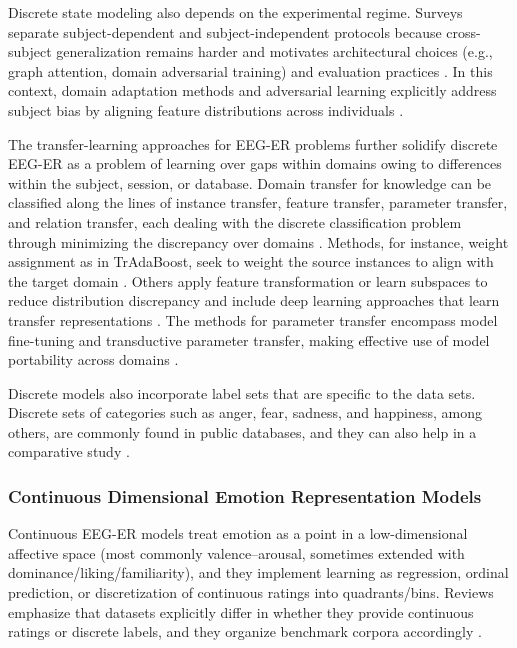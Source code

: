 \documentclass{WileyMSP-template}
\begin{document}
Discrete state modeling also depends on the experimental regime. Surveys separate subject-dependent and subject-independent protocols because cross-subject generalization remains harder and motivates architectural choices (e.g., graph attention, domain adversarial training) and evaluation practices \cite{ma2024peerjreview}. In this context, domain adaptation methods and adversarial learning explicitly address subject bias by aligning feature distributions across individuals \cite{geng2025dlreview}. 

The transfer-learning approaches for EEG-ER problems further solidify discrete EEG-ER as a problem of learning over gaps within domains owing to differences within the subject, session, or database. Domain transfer for knowledge can be classified along the lines of instance transfer, feature transfer, parameter transfer, and relation transfer, each dealing with the discrete classification problem through minimizing the discrepancy over domains \cite{li2022transferreview}. Methods, for instance, weight assignment as in TrAdaBoost, seek to weight the source instances to align with the target domain \cite{li2022transferreview}. Others apply feature transformation or learn subspaces to reduce distribution discrepancy and include deep learning approaches that learn transfer representations \cite{li2022transferreview}. The methods for parameter transfer encompass model fine-tuning and transductive parameter transfer, making effective use of model portability across domains \cite{li2022transferreview}. 

Discrete models also incorporate label sets that are specific to the data sets. Discrete sets of categories such as anger, fear, sadness, and happiness, among others, are commonly found in public databases, and they can also help in a comparative study \cite{li2022transferreview}.

\subsubsection{Continuous Dimensional Emotion Representation Models}
Continuous EEG-ER models treat emotion as a point in a low-dimensional affective space (most commonly valence–arousal, sometimes extended with dominance/liking/familiarity), and they implement learning as regression, ordinal prediction, or discretization of continuous ratings into quadrants/bins. Reviews emphasize that datasets explicitly differ in whether they provide continuous ratings or discrete labels, and they organize benchmark corpora accordingly \cite{wang2024researchprogress}.
\end{document}
